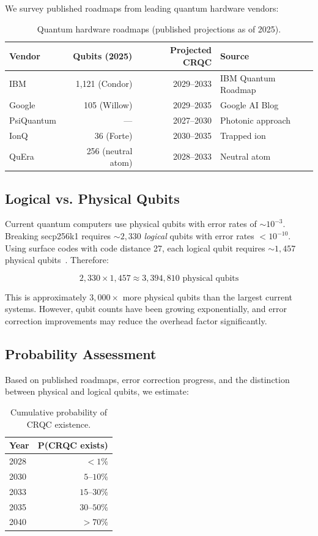 \documentclass[11pt,a4paper]{article}
\begin{document}
We survey published roadmaps from leading quantum hardware vendors:

\begin{table}[ht]
\centering
\caption{Quantum hardware roadmaps (published projections as of 2025).}
\label{tab:roadmaps}
\begin{tabular}{lrrl}
\toprule
\textbf{Vendor} & \textbf{Qubits (2025)} & \textbf{Projected CRQC} & \textbf{Source} \\
\midrule
IBM & 1{,}121 (Condor) & 2029--2033 & IBM Quantum Roadmap \\
Google & 105 (Willow) & 2029--2035 & Google AI Blog \\
PsiQuantum & --- & 2027--2030 & Photonic approach \\
IonQ & 36 (Forte) & 2030--2035 & Trapped ion \\
QuEra & 256 (neutral atom) & 2028--2033 & Neutral atom \\
\bottomrule
\end{tabular}
\end{table}

\subsection{Logical vs. Physical Qubits}

Current quantum computers use physical qubits with error rates of $\sim$$10^{-3}$.
Breaking secp256k1 requires $\sim$$2{,}330$ \emph{logical} qubits with error rates
$< 10^{-10}$. Using surface codes with code distance 27, each logical qubit requires
$\sim$$1{,}457$ physical qubits~\cite{gidney2021factor}. Therefore:

\[
  2{,}330 \times 1{,}457 \approx 3{,}394{,}810 \text{ physical qubits}
\]

This is approximately $3{,}000\times$ more physical qubits than the largest current
systems. However, qubit counts have been growing exponentially, and error correction
improvements may reduce the overhead factor significantly.

\subsection{Probability Assessment}

Based on published roadmaps, error correction progress, and the distinction between
physical and logical qubits, we estimate:

\begin{table}[ht]
\centering
\caption{Cumulative probability of CRQC existence.}
\label{tab:crqc-probability}
\begin{tabular}{lr}
\toprule
\textbf{Year} & \textbf{P(CRQC exists)} \\
\midrule
2028 & $< 1\%$ \\
2030 & $5\text{--}10\%$ \\
2033 & $15\text{--}30\%$ \\
2035 & $30\text{--}50\%$ \\
2040 & $> 70\%$ \\
\bottomrule
\end{tabular}
\end{table}
\end{document}
